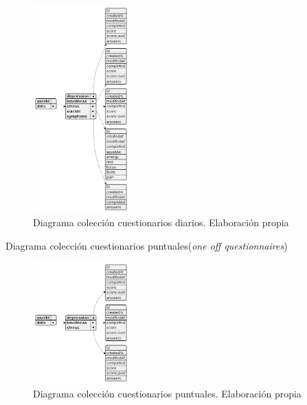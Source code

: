 \begin{figure}[h]
    \centering
    \includegraphics[width=0.33\textwidth]{figures/bd/Servidor daily questionnaires.png}
    \caption[Diagrama colección cuestionarios diarios]{Diagrama colección cuestionarios diarios. Elaboración propia}
    \label{figure:disenio:diagrama_daily}
\end{figure}

Diagrama colección cuestionarios puntuales(\textit{one off questionnaires})

\begin{figure}[h]
    \centering
    \includegraphics[width=0.33\textwidth]{figures/bd/Servidor one off questionnaires.png}
    \caption[Diagrama colección cuestionarios puntuales]{Diagrama colección cuestionarios puntuales. Elaboración propia}
    \label{figure:disenio:diagrama_one_off}
\end{figure}